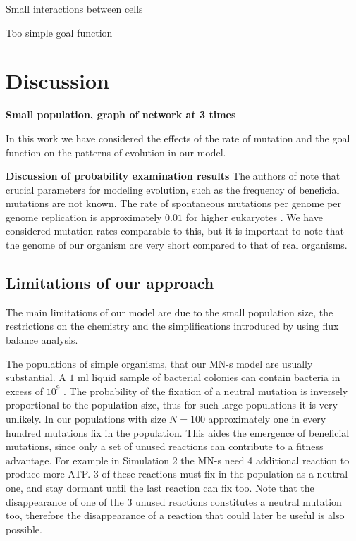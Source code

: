 \documentclass[a4paper,12pt]{article}
\begin{document}
Small interactions between cells

Too simple goal function



\section{Discussion}
\label{sec:discussion}
\textbf{Small population, graph of network at 3 times}

In this work we have considered the effects of the rate of mutation and the goal function on the patterns of evolution in our model. 

\textbf{Discussion of probability examination results}
The authors of \cite{predictability} note that crucial parameters for modeling evolution, such as the frequency of beneficial mutations are not known. The rate of spontaneous mutations per genome per genome replication is approximately $0.01$ for higher eukaryotes \cite{mutationrate}. We have considered mutation rates comparable to this, but it is important to note that the genome of our organism are very short compared to that of real organisms.  

\subsection{Limitations of our approach}
\label{sub:limitations}


The main limitations of our model are due to the small population size, the restrictions on the chemistry and the simplifications introduced by using flux balance analysis. 

The populations of simple organisms, that our MN-s model are usually substantial. A $1$ ml liquid sample of bacterial colonies can contain bacteria in excess of $10^9$ \cite{barteklecture}. The probability of the fixation of a neutral mutation is inversely proportional to the population size, thus for such large populations it is very unlikely. In our populations with size $N=100$ approximately one in every hundred mutations fix in the population. This aides the emergence of beneficial mutations, since only a set of unused reactions can contribute to a fitness advantage. For example in Simulation 2 the MN-s need 4 additional reaction to produce more ATP. $3$ of these reactions must fix in the population as a neutral one, and stay dormant until the last reaction can fix too. Note that the disappearance of one of the $3$ unused reactions constitutes a neutral mutation too, therefore the disappearance of a reaction that could later be useful is also possible.
\end{document}
